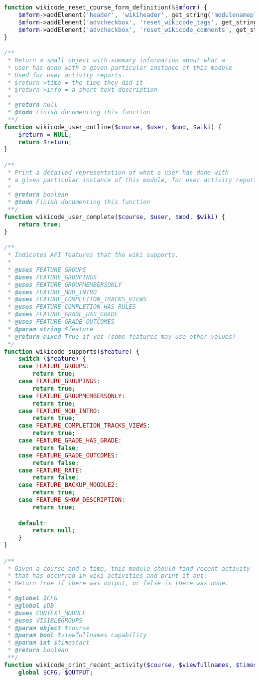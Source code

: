 \begin{lstlisting}[language=PHP]
function wikicode_reset_course_form_definition(&$mform) {
    $mform->addElement('header', 'wikiheader', get_string('modulenameplural', 'wikicode'));
    $mform->addElement('advcheckbox', 'reset_wikicode_tags', get_string('removeallwikitags', 'wikicode'));
    $mform->addElement('advcheckbox', 'reset_wikicode_comments', get_string('deleteallcomments'));
}

/**
 * Return a small object with summary information about what a
 * user has done with a given particular instance of this module
 * Used for user activity reports.
 * $return->time = the time they did it
 * $return->info = a short text description
 *
 * @return null
 * @todo Finish documenting this function
 **/
function wikicode_user_outline($course, $user, $mod, $wiki) {
    $return = NULL;
    return $return;
}

/**
 * Print a detailed representation of what a user has done with
 * a given particular instance of this module, for user activity reports.
 *
 * @return boolean
 * @todo Finish documenting this function
 **/
function wikicode_user_complete($course, $user, $mod, $wiki) {
    return true;
}

/**
 * Indicates API features that the wiki supports.
 *
 * @uses FEATURE_GROUPS
 * @uses FEATURE_GROUPINGS
 * @uses FEATURE_GROUPMEMBERSONLY
 * @uses FEATURE_MOD_INTRO
 * @uses FEATURE_COMPLETION_TRACKS_VIEWS
 * @uses FEATURE_COMPLETION_HAS_RULES
 * @uses FEATURE_GRADE_HAS_GRADE
 * @uses FEATURE_GRADE_OUTCOMES
 * @param string $feature
 * @return mixed True if yes (some features may use other values)
 */
function wikicode_supports($feature) {
    switch ($feature) {
    case FEATURE_GROUPS:
        return true;
    case FEATURE_GROUPINGS:
        return true;
    case FEATURE_GROUPMEMBERSONLY:
        return true;
    case FEATURE_MOD_INTRO:
        return true;
    case FEATURE_COMPLETION_TRACKS_VIEWS:
        return true;
    case FEATURE_GRADE_HAS_GRADE:
        return false;
    case FEATURE_GRADE_OUTCOMES:
        return false;
    case FEATURE_RATE:
        return false;
    case FEATURE_BACKUP_MOODLE2:
        return true;
    case FEATURE_SHOW_DESCRIPTION:
        return true;

    default:
        return null;
    }
}

/**
 * Given a course and a time, this module should find recent activity
 * that has occurred in wiki activities and print it out.
 * Return true if there was output, or false is there was none.
 *
 * @global $CFG
 * @global $DB
 * @uses CONTEXT_MODULE
 * @uses VISIBLEGROUPS
 * @param object $course
 * @param bool $viewfullnames capability
 * @param int $timestart
 * @return boolean
 **/
function wikicode_print_recent_activity($course, $viewfullnames, $timestart) {
    global $CFG, $OUTPUT;


\end{lstlisting}
